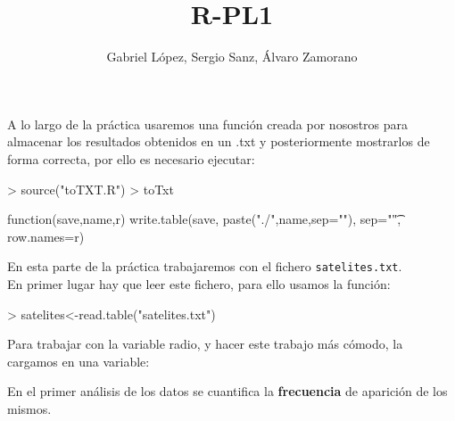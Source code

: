 \documentclass [a4paper] {article}
\title{R-PL1}
\author{Gabriel L\'opez, Sergio Sanz, \'Alvaro Zamorano}
\begin{document}
\maketitle

A lo largo de la pr\'actica usaremos una funci\'on creada por nosostros para almacenar los resultados obtenidos en un .txt y posteriormente
mostrarlos de forma correcta, por ello es necesario ejecutar:
\begin{Schunk}
\begin{Sinput}
> source("toTXT.R")
> toTxt
\end{Sinput}
\begin{Soutput}
function(save,name,r) {
    write.table(save, paste("./",name,sep=""), sep="\t", row.names=r) 
}
\end{Soutput}
\end{Schunk}

\graphicspath{ {C:/Users/tromp/Documents/1.Curso_2019-20/1.Cuatrimetestre/2.Ciencia_Datos/LAB/CienciaDatos/Practica1/} }

En esta parte de la pr\'actica trabajaremos con el fichero
\texttt{satelites.txt}.\\

\bigskip
En primer lugar hay que leer este fichero, para ello usamos
la funci\'on:
\begin{Schunk}
\begin{Sinput}
> satelites<-read.table("satelites.txt")
\end{Sinput}
\end{Schunk}

\bigskip
Para trabajar con la variable radio, y hacer este trabajo m\'as
c\'omodo, la cargamos en una variable:
\begin{Schunk}
\end{Schunk}

\bigskip
En el primer an\'alisis de los datos se cuantifica la \textbf{frecuencia}
de aparici\'on de los mismos. 
\end{document}
